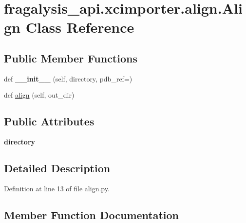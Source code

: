 \hypertarget{classfragalysis__api_1_1xcimporter_1_1align_1_1_align}{}\section{fragalysis\+\_\+api.\+xcimporter.\+align.\+Align Class Reference}
\label{classfragalysis__api_1_1xcimporter_1_1align_1_1_align}
\subsection*{Public Member Functions}
\begin{DoxyCompactItemize}
\item 
\mbox{\label{classfragalysis__api_1_1xcimporter_1_1align_1_1_align_a28e5edc1a05680d36665012eff20a271}} 
def {\bfseries \+\_\+\+\_\+init\+\_\+\+\_\+} (self, directory, pdb\+\_\+ref=\textquotesingle{}\textquotesingle{})
\item 
def \hyperlink{classfragalysis__api_1_1xcimporter_1_1align_1_1_align_a554c8cc5acbc9f5e86bb668c49ea1254}{align} (self, out\+\_\+dir)
\end{DoxyCompactItemize}
\subsection*{Public Attributes}
\begin{DoxyCompactItemize}
\item 
\mbox{\label{classfragalysis__api_1_1xcimporter_1_1align_1_1_align_aaa8ff46caee489ab4cab5279ac946bcc}} 
{\bfseries directory}
\end{DoxyCompactItemize}


\subsection{Detailed Description}


Definition at line 13 of file align.\+py.



\subsection{Member Function Documentation}
\mbox{\label{classfragalysis__api_1_1xcimporter_1_1align_1_1_align_a554c8cc5acbc9f5e86bb668c49ea1254}} 
